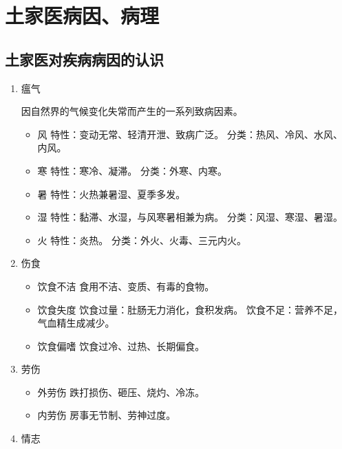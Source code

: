 \documentclass[cn,black,12pt,normal,founder]{elegantnote}
\begin{document}
\section{土家医病因、病理}

\subsection{土家医对疾病病因的认识}

\begin{enumerate}
  \item 瘟气

  因自然界的气候变化失常而产生的一系列致病因素。

  \begin{itemize}
    \item 风
    \subitem 特性：变动无常、轻清开泄、致病广泛。
    \subitem 分类：热风、冷风、水风、内风。

    \item 寒
    \subitem 特性：寒冷、凝滞。
    \subitem 分类：外寒、内寒。
    \item 暑
    \subitem 特性：火热兼暑湿、夏季多发。
    \item 湿
    \subitem 特性：黏滞、水湿，与风寒暑相兼为病。
    \subitem 分类：风湿、寒湿、暑湿。
    \item 火
    \subitem 特性：炎热。
    \subitem 分类：外火、火毒、三元内火。
  \end{itemize}

  \item 伤食

  \begin{itemize}
    \item 饮食不洁
    \subitem 食用不洁、变质、有毒的食物。
    \item 饮食失度
    \subitem 饮食过量：肚肠无力消化，食积发病。
    \subitem 饮食不足：营养不足，气血精生成减少。
    \item 饮食偏嗜
    \subitem 饮食过冷、过热、长期偏食。
  \end{itemize}

  \item 劳伤

  \begin{itemize}
    \item 外劳伤
    \subitem 跌打损伤、砸压、烧灼、冷冻。
    \item 内劳伤
    \subitem 房事无节制、劳神过度。
  \end{itemize}

  \item 情志


\end{enumerate}
\end{document}
